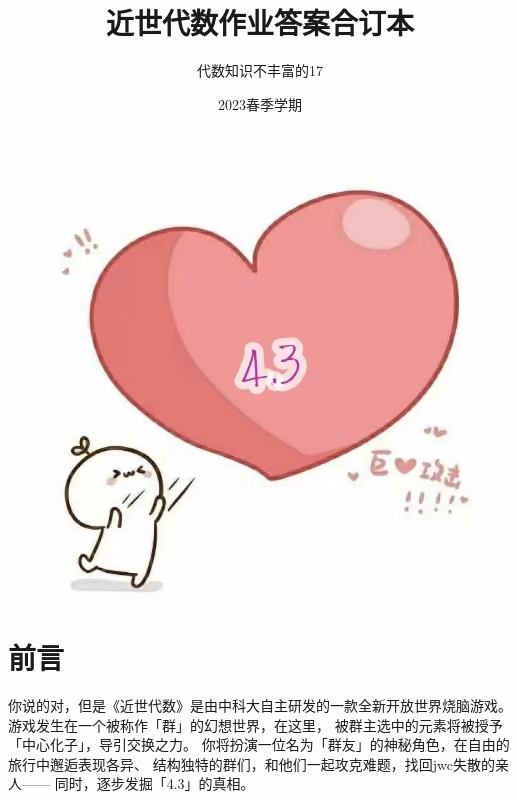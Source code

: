 \documentclass[12pt, a4paper, fontset=windows]{ctexart}
\title{\Huge\bf 近世代数作业答案合订本}
\author{代数知识不丰富的17}
\date{2023春季学期}
\begin{document}
\setcounter{page}{-1}

\maketitle

\begin{figure}[!htbp]
    \centering
    \includegraphics[width=\textwidth]{figs/4.3.jpg}
\end{figure}

\thispagestyle{empty}

\clearpage

\begin{center}
    \tableofcontents
\end{center}

\thispagestyle{empty}

\clearpage
{}
\part*{前言}

你说的对，但是《近世代数》是由中科大自主研发的一款全新开放世界烧脑游戏。
游戏发生在一个被称作「群」的幻想世界，在这里，
被群主选中的元素将被授予「中心化子」，导引交换之力。
你将扮演一位名为「群友」的神秘角色，在自由的旅行中邂逅表现各异、
结构独特的群们，和他们一起攻克难题，找回jwc失散的亲人——
同时，逐步发掘「4.3」的真相。
\end{document}

